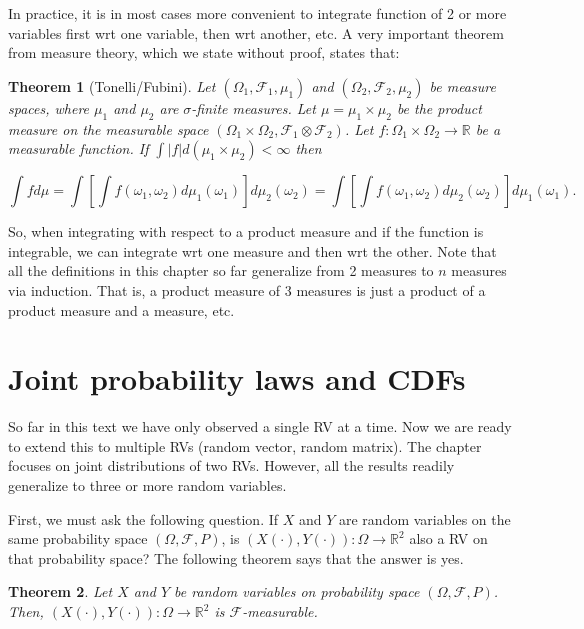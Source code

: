 \documentclass{book}
\theoremstyle{plain}%
\newtheorem{theorem}{Theorem}[section]
\theoremstyle{definition}
\newlength{\arrow}
\begin{document}
In practice, it is in most cases more convenient to integrate function of 2 or more variables first wrt one variable, then wrt another, etc. A very important theorem from measure theory, which we state without proof, states that:

\begin{theorem}[Tonelli/Fubini] Let $(\Omega_1, \mathcal{F}_1, \mu_1)$ and $(\Omega_2, \mathcal{F}_2, \mu_2)$ be measure spaces, where $\mu_1$ and $\mu_2$ are $\sigma$-finite measures. Let $\mu = \mu_1 \times \mu_2$  be the product measure on the measurable space $(\Omega_1 \times \Omega_2, \mathcal{F}_1 \otimes \mathcal{F}_2)$. Let $f: \Omega_1 \times \Omega_2 \rightarrow \mathbb{R}$ be a measurable function. If $\int |f| d(\mu_1 \times \mu_2) < \infty$ then

$$\int f d\mu = \int \left[\int f(\omega_1, \omega_2) d\mu_1(\omega_1)\right]d\mu_2(\omega_2) = \int \left[\int f(\omega_1, \omega_2) d\mu_2(\omega_2)\right]d\mu_1(\omega_1).$$
\end{theorem}

So, when integrating with respect to a product measure and if the function is integrable, we can integrate wrt one measure and then wrt the other. Note that all the definitions in this chapter so far generalize from 2 measures to $n$ measures via induction. That is, a product measure of 3 measures is just a product of a product measure and a measure, etc.

\section{Joint probability laws and CDFs}

So far in this text we have only observed a single RV at a time. Now we are ready to extend this to multiple RVs (random vector, random matrix). The chapter focuses on joint distributions of two RVs. However, all the results readily generalize to three or more random variables.

First, we must ask the following question. If $X$ and $Y$ are random variables on the same probability space $(\Omega, \mathcal{F}, P)$, is $(X(\cdot), Y(\cdot)):\Omega \rightarrow \mathbb{R}^2$ also a RV on that probability space? The following theorem says that the answer is yes.

\begin{theorem}
Let $X$ and $Y$ be random variables on probability space $(\Omega, \mathcal{F}, P)$. Then, $(X(\cdot), Y(\cdot)):\Omega \rightarrow \mathbb{R}^2$ is $\mathcal{F}$-measurable.
\end{theorem}
\end{document}
